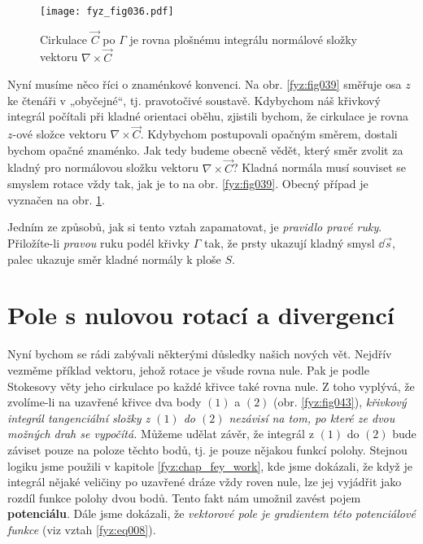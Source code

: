 {    \begin{figure}[ht!]  %
      \centering
      \texttt{[image: fyz\_fig036.pdf]}
      \caption{Cirkulace \(\vec{C}\) po \(\Gamma\) je rovna plošnému integrálu normálové složky
        vektoru \(\nabla\times\vec{C}\)}
      \label{fyz:fig036}   
    \end{figure} 
    Nyní musíme něco říci o znaménkové konvenci. Na obr. \ref{fyz:fig039} směřuje osa 
    \(z\) ke čtenáři v „obyčejné“, tj. pravotočivé soustavě. Kdybychom náš křivkový integrál 
    počítali při kladné orientaci oběhu, zjistili bychom, že cirkulace je rovna \(z\)-ové složce 
    vektoru \(\nabla\times\vec{C}\). Kdybychom postupovali opačným směrem, dostali bychom opačné 
    znaménko. Jak tedy budeme obecně vědět, který směr zvolit za kladný pro normálovou složku 
    vektoru \(\nabla\times\vec{C}\)? Kladná normála musí souviset se smyslem rotace vždy tak, jak 
    je to na obr. \ref{fyz:fig039}. Obecný případ je vyznačen na obr. \ref{fyz:fig036}.

    Jedním ze způsobů, jak si tento vztah zapamatovat, je \emph{pravidlo pravé ruky}. Přiložíte-li
    \emph{pravou} ruku podél křivky \(\Gamma\) tak, že prsty ukazují kladný smysl \(\dd{\vec{s}}\), 
    palec ukazuje směr kladné normály k ploše \(S\).


  \section{Pole s nulovou rotací a divergencí}\label{fyz:sec_001}
    Nyní bychom se rádi zabývali některými důsledky našich nových vět. Nejdřív vezměme příklad 
    vektoru, jehož rotace je všude rovna nule. Pak je podle Stokesovy věty jeho cirkulace po každé 
    křivce také rovna nule. Z toho vyplývá, že zvolíme-li na uzavřené křivce dva body \((1)\) a 
    \((2)\) (obr. \ref{fyz:fig043}), \emph{křivkový integrál tangenciální složky z \((1)\) do 
    \((2)\) nezávisí na tom, po které ze dvou možných drah se vypočítá.} Můžeme udělat závěr, že 
    integrál z \((1)\) do \((2)\) bude záviset pouze na poloze těchto bodů, tj. je pouze nějakou 
    funkcí polohy. Stejnou logiku jsme použili v kapitole \ref{fyz:chap_fey_work}, kde jsme 
    dokázali, že když je integrál nějaké veličiny po uzavřené dráze vždy roven nule, lze jej 
    vyjádřit jako rozdíl funkce polohy dvou bodů. Tento fakt nám umožnil zavést pojem 
    \textbf{potenciálu}. Dále jsme dokázali, že \emph{vektorové pole je gradientem této 
    potenciálové funkce} (viz vztah \ref{fyz:eq008}).

}
